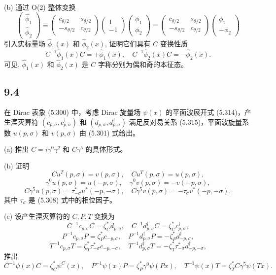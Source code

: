 (b) 通过 O(2) 整体变换
$$\begin{pmatrix}
\hat{\phi}_1 \\
\hat{\phi}_2
\end{pmatrix} \equiv \begin{pmatrix}
c_{\theta/2} & s_{\theta/2} \\
-s_{\theta/2} & c_{\theta/2}
\end{pmatrix} \begin{pmatrix}
1 \\
-1
\end{pmatrix} \begin{pmatrix}
\phi_1 \\
\phi_2
\end{pmatrix} = \begin{pmatrix}
c_{\theta/2} & s_{\theta/2} \\
-s_{\theta/2} & c_{\theta/2}
\end{pmatrix} \begin{pmatrix}
\phi_1 \\
-\phi_2
\end{pmatrix} \tag{9.550}$$
引入实标量场 $\hat{\phi}_1(x)$ 和 $\hat{\phi}_2(x)$, 证明它们具有 $ C $ 变换性质
$$C^{-1} \hat{\phi}_1(x) C = + \hat{\phi}_1(x), \quad C^{-1} \hat{\phi}_2(x) C = -\hat{\phi}_2(x). \tag{9.551}$$
可见, $\hat{\phi}_1(x)$ 和 $\hat{\phi}_2(x)$ 是 $ C $ 字称分别为偶和奇的本征态。

\newpage
\subsection{9.4}
在 Dirac 表象 (5.300) 中，考虑 Dirac 旋量场 $\psi(x)$ 的平面波展开式 (5.314)，产生湮灭算符 $(c_{p,\sigma}, c_{p,\sigma}^\dagger)$ 和 $(d_{p,\sigma}, d_{p,\sigma}^\dagger)$ 满足反对易关系 (5.315)，平面波旋量系数 $u(p, \sigma)$ 和 $v(p, \sigma)$ 由 (5.301) 式给出。

(a) 推出 $C = i \gamma^0 \gamma^2$ 和 $C \gamma^5$ 的具体形式。

(b) 证明
$$Cu^T(p, \sigma) = v(p, \sigma), \quad Cu^T(p, \sigma) = u(p, \sigma), \tag{9.552}$$
$$\gamma^0 u(p, \sigma) = u(-p, \sigma), \quad \gamma^0 v(p, \sigma) = -v(-p, \sigma), \tag{9.553}$$
$$C \gamma^5 u(p, \sigma) = \tau_{-\sigma}^* u^*(-p, -\sigma), \quad C \gamma^5 v(p, \sigma) = -\tau_{\sigma} v^*(-p, -\sigma), \tag{9.554}$$
其中 $\tau_{\sigma}$ 是 (5.308) 式中的相位因子。

(c) 设产生湮灭算符的 $C, P, T$ 变换为
$$C^{-1} c_{p,\sigma} C = \zeta_C^* d_{p,\sigma}, \quad C^{-1} d_{p,\sigma}^\dagger C = \zeta_C^* c_{p,\sigma}^\dagger, \tag{9.555}$$
$$P^{-1} c_{p,\sigma} P = \zeta_P^* c_{-p,\sigma}, \quad P^{-1} d_{p,\sigma}^\dagger P = -\zeta_P^* d_{-p,\sigma}^\dagger, \tag{9.556}$$
$$T^{-1} c_{p,\sigma} T = \zeta_T^* \tau_{-\sigma}^* c_{-p,-\sigma}, \quad T^{-1} d_{p,\sigma}^\dagger T = -\zeta_T^* \tau_{-\sigma}^* d_{-p,-\sigma}^\dagger, \tag{9.557}$$
推出
$$C^{-1} \psi(x) C = \zeta_C^* \psi^C(x), \quad P^{-1} \psi(x) P = \zeta_P^* \gamma^0 \psi(Px), \quad T^{-1} \psi(x) T = \zeta_T^* C \gamma^5 \psi(Tx). \tag{9.558}$$

